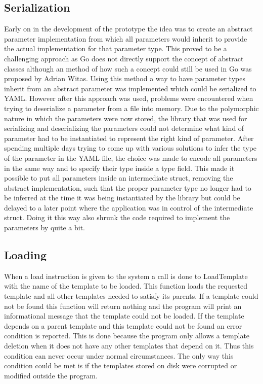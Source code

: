 \subsection{Serialization}
Early on in the development of the prototype the idea was to create an abstract parameter implementation from which all parameters would inherit to provide the actual implementation for that parameter type.
This proved to be a challenging approach as Go does not directly support the concept of abstract classes although an method of how such a concept could still be used in Go was proposed by Adrian Witas\cite{witas_abstract_2018}.
Using this method a way to have parameter types inherit from an abstract parameter was implemented which could be serialized to YAML.
However after this approach was used, problems were encountered when trying to deserialize a parameter from a file into memory.
Due to the polymorphic nature in which the parameters were now stored, the library that was used for serializing and deserializing the parameters could not determine what kind of parameter had to be instantiated to represent the right kind of parameter.
After spending multiple days trying to come up with various solutions to infer the type of the parameter in the YAML file, the choice was made to encode all parameters in the same way and to specify their type inside a type field.
This made it possible to put all parameters inside an intermediate struct, removing the abstract implementation, such that the proper parameter type no longer had to be inferred at the time it was being instantiated by the library but could be delayed to a later point where the application was in control of the intermediate struct.
Doing it this way also shrunk the code required to implement the parameters by quite a bit.

\subsection{Loading}
When a load instruction is given to the system a call is done to LoadTemplate with the name of the template to be loaded.
This function loads the requested template and all other templates needed to satisfy its parents.
If a template could not be found this function will return nothing and the program will print an informational message that the template could not be loaded.
If the template depends on a parent template and this template could not be found an error condition is reported.
This is done because the program only allows a template deletion when it does not have any other templates that depend on it.
Thus this condition can never occur under normal circumstances.
The only way this condition could be met is if the templates stored on disk were corrupted or modified outside the program.


